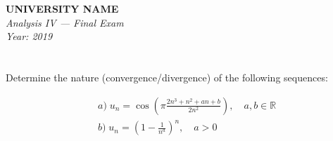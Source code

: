 \documentclass[12pt]{article}
\begin{document}
\begin{center}
  \Large\textbf{UNIVERSITY NAME} \\[1em]
  \large\textit{Analysis IV — Final Exam} \\[0.5em]
  \large\textit{Year: 2019} \\[2em]
\end{center}

\vspace{0.5cm}

\section{}
Determine the nature (convergence/divergence) of the following sequences:

\[
\begin{aligned}
&a) \; u_n = \cos \left( \pi \frac{2n^3 + n^2 + a n + b}{2n^2} \right), \quad a, b \in \mathbb{R} \\
&b) \; u_n = \left( 1 - \frac{1}{n^a} \right)^n, \quad a > 0
\end{aligned}
\]
\end{document}
